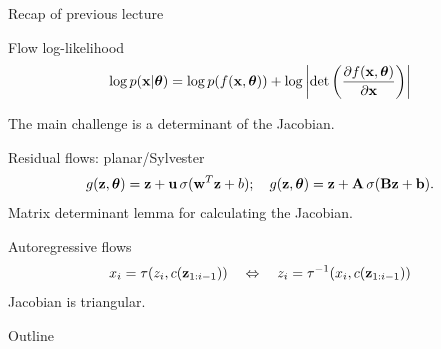 \begin{frame}{Recap of previous lecture}
	\vspace{-0.5cm}
	\begin{block}{Flow log-likelihood}
		\vspace{-0.3cm}
		\[
			\log p(\mathbf{x}|\boldsymbol{\theta}) = \log p(f(\mathbf{x}, \boldsymbol{\theta})) + \log \left|\det \left( \frac{\partial f(\mathbf{x}, \boldsymbol{\theta})}{\partial \mathbf{x}} \right) \right|
		\]
		\vspace{-0.5cm}
	\end{block}
	The main challenge is a determinant of the Jacobian.
	\begin{block}{Residual flows: planar/Sylvester}
		\vspace{-0.7cm}
		\[
			g(\mathbf{z}, \boldsymbol{\theta}) = \mathbf{z} + \mathbf{u} \, \sigma(\mathbf{w}^T\mathbf{z} + b); \quad 
			g(\mathbf{z}, \boldsymbol{\theta}) = \mathbf{z} + \mathbf{A} \, \sigma(\mathbf{B}\mathbf{z} + \mathbf{b}).
		\]
		Matrix determinant lemma for calculating the Jacobian.
	\end{block}
	\begin{block}{Autoregressive flows}	
		\vspace{-0.4cm}
		\[
			x_i = \tau (z_i, c(\mathbf{z}_{1:i-1})) \quad \Leftrightarrow \quad z_i = \tau^{-1} (x_i, c(\mathbf{z}_{1:i-1}))
		\]
		Jacobian is triangular.
	\end{block}
\end{frame}
\begin{frame}{Outline}
	\tableofcontents
\end{frame}
